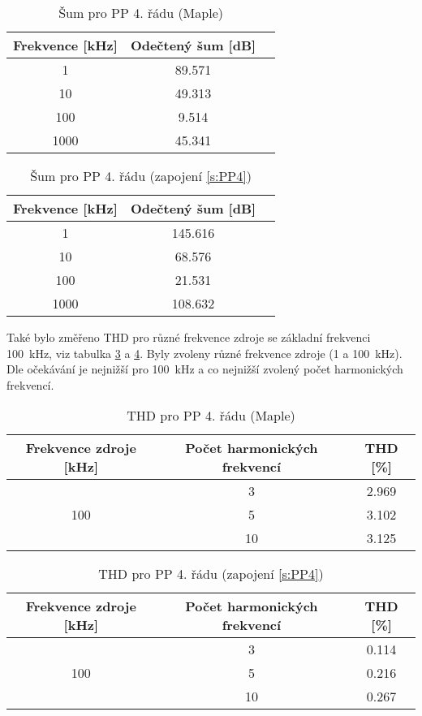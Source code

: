 \begin{table}[h]
\centering
  \begin{tabular}{ | c | c | c |}
    \hline
     Frekvence [kHz] & Odečtený šum [dB] \\ \hline
    1 & 89.571 \\ \hline
    10 & 49.313 \\ \hline
    100 & 9.514 \\ \hline
    1000 & 45.341 \\ \hline
  \end{tabular}
  \caption[Šum pro PP 4. řádu (Maple)]{Šum pro PP 4. řádu (Maple) \label{s:THD1}}
\end{table}
  \begin{table}[h]
\centering
  \begin{tabular}{ | c | c | c |}
    \hline
     Frekvence [kHz] & Odečtený šum [dB] \\ \hline
    1 & 145.616 \\ \hline
    10 & 68.576 \\ \hline
    100 & 21.531 \\ \hline
    1000 & 108.632 \\ \hline
  \end{tabular}
\caption[Šum pro PP 4. řádu]{Šum pro PP 4. řádu (zapojení \ref{s:PP4}) \label{s:THD2}}
\end{table}
\noindent Také bylo změřeno THD pro různé frekvence zdroje se základní frekvenci 100~kHz, viz tabulka \ref{s:THD3} a \ref{s:THD4}. Byly zvoleny různé frekvence zdroje (1 a 100~kHz). Dle očekávání je nejnižší pro 100~kHz a co nejnižší zvolený počet harmonických frekvencí.
\begin{table}[h]
\centering
\renewcommand{\arraystretch}{1.15}
  \begin{tabular}{ | c | c | c |}
    \hline
    Frekvence zdroje [kHz] & Počet harmonických frekvencí & THD [\%] \\ \hline
	\multirow{3}{*}{100} & 3 & 2.969\\& 5 & 3.102 \\& 10 & 3.125 \\ \hline
  \end{tabular}
  \caption[THD pro PP 4. řádu (Maple)]{THD pro PP 4. řádu (Maple) \label{s:THD3}}
\end{table}
\begin{table}[h]
\centering
\renewcommand{\arraystretch}{1.15}
  \begin{tabular}{ | c | c | c |} 
    \hline
     Frekvence zdroje [kHz] & Počet harmonických frekvencí & THD [\%] \\ \hline
	\multirow{3}{*}{100} & 3 & 0.114\\& 5 & 0.216 \\& 10 & 0.267 \\ \hline
  \end{tabular}
  \caption[THD pro PP 4. řádu]{THD pro PP 4. řádu (zapojení \ref{s:PP4}) \label{s:THD4}}
\end{table}